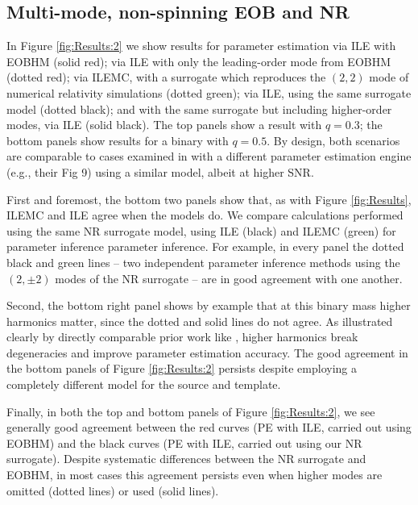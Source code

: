 \documentclass[aps,prd,nofootinbib,showpacs,amssymb,twocolumn]{revtex4}
\begin{document}
\subsection{Multi-mode, non-spinning EOB and NR}

In Figure \ref{fig:Results:2} we show results for  parameter estimation via ILE with EOBHM (solid red); via ILE with
only the leading-order mode from EOBHM (dotted red);  via ILEMC, with a surrogate which reproduces the
$(2,2)$ mode of numerical relativity simulations \cite{gwastro-approx-ROMNR-Blackman2015} (dotted green);  via ILE,
using the same surrogate model (dotted black); and with the same surrogate but including higher-order modes, via ILE
(solid black). The top panels show a
result with $q=0.3$;
%
%
the bottom panels show results for  a binary with $q=0.5$. By design,
both scenarios are comparable to  cases examined in \cite{2015PhRvD..92b2002G} with a different parameter estimation
engine (e.g., their Fig 9) using a similar model, albeit at higher SNR.  

%
First and foremost, the bottom two panels show that, as with Figure \ref{fig:Results}, ILEMC and ILE agree  when the
models do.
We compare calculations performed using the same NR surrogate model, using ILE (black) and
  ILEMC (green) for parameter inference parameter inference.   For example, in every panel  the dotted black and green lines  -- two independent parameter inference methods using the $(2,\pm 2)$ modes of the NR surrogate -- are in
  good agreement with one another.

%
%
%
%
Second, the bottom right panel shows by example that at this binary mass higher harmonics matter, since the dotted
and solid lines do not agree.    
%
As illustrated clearly by directly comparable prior work like \cite{2015PhRvD..92b2002G}, higher harmonics break
degeneracies and improve parameter estimation accuracy.  
The good agreement in the bottom panels of Figure \ref{fig:Results:2} persists despite employing a completely different
model for the source and template.  
%

Finally, in both the top and bottom panels of Figure  \ref{fig:Results:2}, we see generally good agreement between
  the red curves (PE with ILE, carried out using EOBHM) and the black curves (PE with ILE, carried out using our NR
  surrogate).  Despite systematic differences between the NR surrogate and EOBHM, in most cases this agreement persists
  even when higher modes are omitted (dotted lines) or used (solid lines). 


%
%
%
%
%
%
\end{document}
